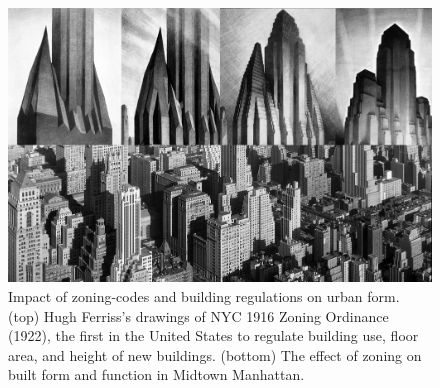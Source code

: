 {    \begin{figure}[!htb]
        \begin{center}
            \includegraphics[width=1\textwidth]{chapters/transformation/playground/figures/playground.jpeg}
        \end{center}
        \caption{Impact of zoning-codes and building regulations on urban form. (top) Hugh Ferriss's drawings of NYC 1916 Zoning Ordinance (1922), the first in the United States to regulate building use, floor area, and height of new buildings. (bottom) The effect of zoning on built form and function in Midtown Manhattan.}
        \label{fig:pg_nyc}
    \end{figure}

}
